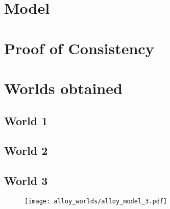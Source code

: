 \section{Model}
	

\section{Proof of Consistency}
		\noindent{}
	
\section{Worlds obtained}
	\subsection{World 1}
	\noindent{}
	
	\subsection{World 2}
	\noindent{}
	
	\subsection{World 3}
\begin{figure}
\begin{center}
		\vspace*{-100pt}
		\hspace*{-50pt}
		\texttt{[image: alloy\_worlds/alloy\_model\_3.pdf]}
		\label{class_diagram}
\end{center}
\end{figure}
	
	